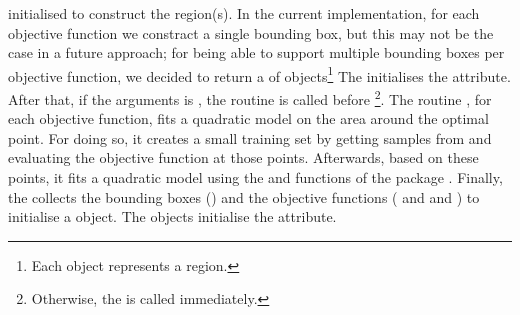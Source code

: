 initialised to construct the region(s). In the current implementation,
for each objective function we constract a single bounding box, but
this may not be the case in a future approach; for being able to
support multiple bounding boxes per objective function, we decided to
return a  of 
objects\footnote{Each  object represents a
  region.} The  initialises the
 attribute. After that, if the
 arguments is , the
 routine is called before
\footnote{Otherwise, the
   is called immediately.}. The routine
, for each objective function, fits a quadratic
model on the area around the optimal point. For doing so, it creates a
small training set by getting samples from 
and evaluating the objective function at those points. Afterwards,
based on these points, it fits a quadratic model using the
 and
 functions of the
 package \autocite{scikit-learn}. Finally, the
 collects the bounding boxes
() and the objective functions
( and
 and
) to initialise a
 object. The  objects
initialise the  attribute.


